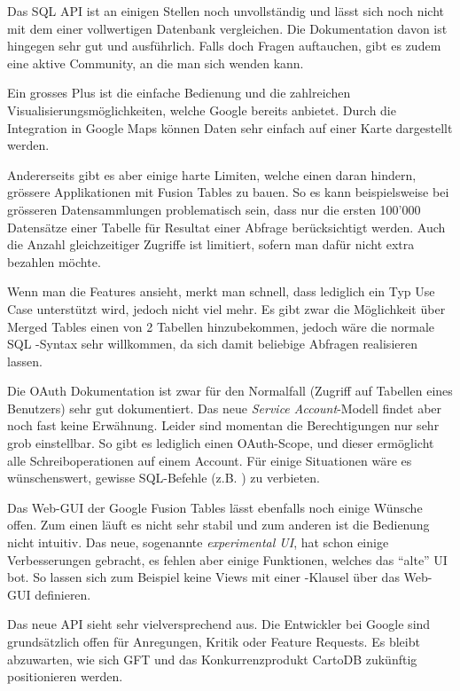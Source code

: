 Das SQL \gls{API} ist an einigen Stellen noch unvollständig und lässt sich noch nicht mit dem einer vollwertigen Datenbank vergleichen. Die Dokumentation davon ist hingegen sehr gut und ausführlich. Falls doch Fragen auftauchen, gibt es zudem eine aktive Community, an die man sich wenden kann. 

Ein grosses Plus ist die einfache Bedienung und die zahlreichen Visualisierungsmöglichkeiten, welche Google bereits anbietet. Durch die Integration in Google Maps können Daten sehr einfach auf einer Karte dargestellt werden.

Andererseits gibt es aber einige harte Limiten, welche einen daran hindern, grössere Applikationen mit Fusion Tables zu bauen. So es kann beispielsweise bei grösseren Datensammlungen problematisch sein, dass nur die ersten 100'000 Datensätze einer Tabelle für Resultat einer Abfrage berücksichtigt werden. Auch die Anzahl gleichzeitiger Zugriffe ist limitiert, sofern man dafür nicht extra bezahlen möchte.

Wenn man die Features ansieht, merkt man schnell, dass lediglich ein Typ Use Case unterstützt wird, jedoch nicht viel mehr. Es gibt zwar die Möglichkeit über Merged Tables einen  von 2 Tabellen hinzubekommen, jedoch wäre die normale SQL -Syntax sehr willkommen, da sich damit beliebige Abfragen realisieren lassen.

Die \gls{OAuth} Dokumentation ist zwar für den Normalfall (Zugriff auf Tabellen eines Benutzers) sehr gut dokumentiert. Das neue \emph{Service Account}-Modell findet aber noch fast keine Erwähnung. Leider sind momentan die Berechtigungen nur sehr grob einstellbar. So gibt es lediglich einen \gls{OAuth}-Scope, und dieser ermöglicht alle Schreiboperationen auf einem Account. Für einige Situationen wäre es wünschenswert, gewisse SQL-Befehle (z.B. ) zu verbieten.

Das Web-GUI der Google Fusion Tables lässt ebenfalls noch einige Wünsche offen. Zum einen läuft es nicht sehr stabil und zum anderen ist die Bedienung nicht intuitiv. Das neue, sogenannte \emph{experimental UI}, hat schon einige Verbesserungen gebracht, es fehlen aber einige Funktionen, welches das "`alte"' UI bot. So lassen sich zum Beispiel keine Views mit einer -Klausel über das Web-GUI definieren. 

Das neue \gls{API} sieht sehr vielversprechend aus. Die Entwickler bei Google sind grundsätzlich offen für Anregungen, Kritik oder Feature Requests. Es bleibt abzuwarten, wie sich GFT und das Konkurrenzprodukt CartoDB zukünftig positionieren werden.